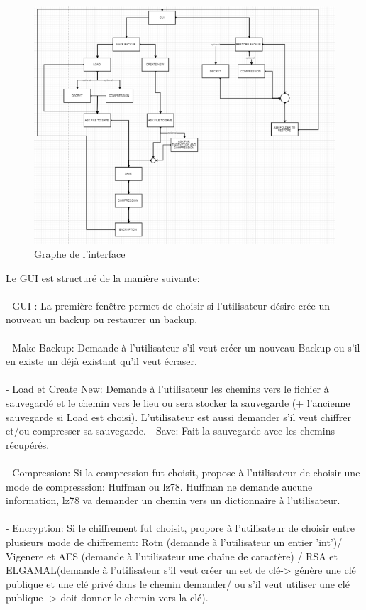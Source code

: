 	\begin{figure}[!h]
		\centering
		\includegraphics[width=13.1cm]{images/graph_gui.png}
		\caption{Graphe de l'interface}
		\label{Graphe de l'interface}
	\end{figure}
\newpage
	Le GUI est structuré de la manière suivante:\\ \\
	- GUI : La première fenêtre permet de choisir si l'utilisateur désire crée un nouveau un backup ou restaurer un backup.\\\\
	- Make Backup: Demande à l'utilisateur s'il veut créer un nouveau Backup ou s'il en existe un déjà existant qu'il veut écraser.\\\\
	- Load et Create New: Demande à l'utilisateur les chemins vers le fichier à sauvegardé et le chemin vers le lieu ou sera stocker la sauvegarde (+ l'ancienne sauvegarde si Load est choisi). L'utilisateur est aussi demander s'il veut chiffrer et/ou compresser sa sauvegarde.
	- Save: Fait la sauvegarde avec les chemins récupérés.\\\\
	- Compression: Si la compression fut choisit, propose à l'utilisateur de choisir une mode de compresssion: Huffman ou lz78. Huffman ne demande aucune information, lz78 va demander un chemin vers un dictionnaire à l'utilisateur.\\\\
	- Encryption: Si le chiffrement fut choisit, propore à l'utilisateur de choisir entre plusieurs mode de chiffrement: Rotn (demande à l'utilisateur un entier 'int')/ Vigenere et AES (demande à l'utilisateur une chaîne de caractère) / RSA et ELGAMAL(demande à l'utilisateur s'il veut créer un set de clé-> génère une clé publique et une clé privé dans le chemin demander/ ou s'il veut utiliser une clé publique -> doit donner le chemin vers la clé).\\\\
